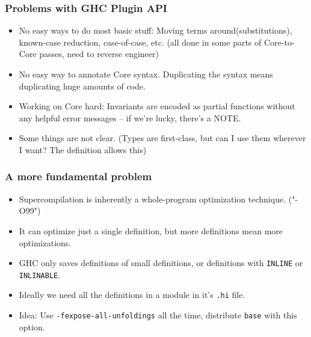 \documentclass{beamer}
\begin{document}
\begin{frame}
    \frametitle{Problems with GHC Plugin API}

    \begin{itemize}[<+->]
        \item
            No easy ways to do most basic stuff: Moving terms
            around(substitutions), known-case reduction, case-of-case, etc.
            (all done in some parts of Core-to-Core passes, need to reverse
            engineer)
        \item
            No easy way to annotate Core syntax. Duplicating the syntax means
            duplicating huge amounts of code.
        \item
            Working on Core hard: Invariants are encoded as partial functions
            without any helpful error messages -- if we're lucky, there's a
            NOTE.
        \item
            Some things are not clear. (Types are first-class, but can I use
            them wherever I want? The definition allows this)
    \end{itemize}
\end{frame}


\begin{frame}
    \frametitle{A more fundamental problem}

    \begin{itemize}[<+->]
        \item[]
            Supercompilation is inherently a whole-program optimization
            technique. ("-O99")
        \item[]
            It can optimize just a single definition, but more definitions mean
            more optimizations.
        \item[]
            GHC only saves definitions of small definitions, or definitions with
            \texttt{INLINE} or \texttt{INLINABLE}.
        \item[]
            Ideally we need all the definitions in a module in it's \texttt{.hi}
            file.
        \item[]
            Idea: Use \texttt{-fexpose-all-unfoldings} all the time, distribute
            \texttt{base} with this option.
    \end{itemize}
\end{frame}
\end{document}
